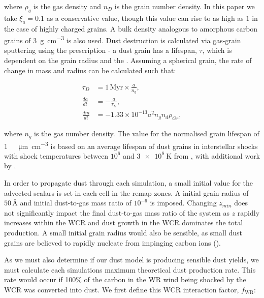 \documentclass[fleqn,usenatbib]{mnras}
\begin{document}
\noindent
where $\rho_g$ is the gas density and $n_D$ is the grain number density.
In this paper we take $\xi_a = 0.1$ as a conservative value, though this value can rise to as high as $1$ in the case of highly charged grains.
A bulk density analogous to amorphous carbon grains of \SI{3}{\gram\per\centi\metre\cubed} is also used.
Dust destruction is calculated via gas-grain sputtering using the \cite{draine_destruction_1979} prescription - a dust grain has a lifespan, $\tau$, which is dependent on the grain radius and the .
Assuming a spherical grain, the rate of change in mass and radius can be calculated such that:

\begin{subequations}
  \begin{align}
           \tau_D & = 1 \, \text{Myr} \times \frac{a}{n_g} , \\
    \frac{da}{dt} & = - \frac{a}{\tau_D} , \\
    \frac{dm}{dt} & = -1.33 \times 10^{-13} a^2 n_g n_d \rho_{Gr} ,
  \end{align}
\end{subequations}

\noindent
where $n_g$ is the gas number density.
The value for the normalised grain lifespan of \SI{1}{\mega\year\micro\metre\per\centi\metre\cubed} is based on an average lifespan of dust grains in interstellar shocks with shock temperatures between $10^6$ and $\SI{3e8}{\kelvin}$ from \cite{dwekCoolingSputteringInfrared1996}, with additional work by \cite{tielens_physics_1994}.

In order to propagate dust through each simulation, a small initial value for the advected scalars is set in each cell in the remap zones.
A initial grain radius of $50 \, \text{\AA}$ and initial dust-to-gas mass ratio of $10^{-6}$ is imposed.
Changing $z_{min}$ does not significantly impact the final dust-to-gas mass ratio of the system as $z$ rapidly increases within the WCR and dust growth in the WCR dominates the total production.
A small initial grain radius would also be sensible, as small dust grains are believed to rapidly nucleate from impinging carbon ions 
(\cite{harriesThreedimensionalDustRadiativetransfer2004}).

As we must also determine if our dust model is producing sensible dust yields, we must calculate each simulations maximum theoretical dust production rate.
This rate would occur if 100\% of the carbon in the WR wind being shocked by the WCR was converted into dust.
We first define this WCR interaction factor, $f_\text{WR}$:
\end{document}
